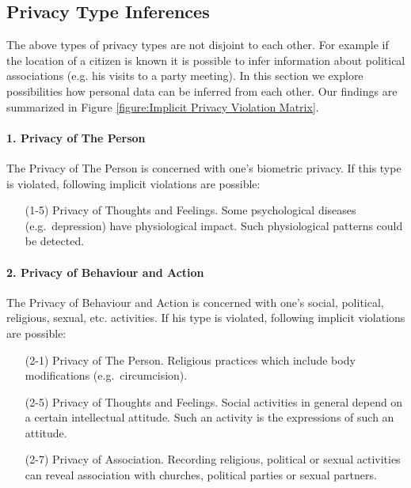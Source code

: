 \subsection{Privacy Type Inferences}

The above types of privacy types are not disjoint to each other.
For example if the location of a citizen is known it is possible to infer information about political associations (e.g. his visits to a party meeting).
In this section we explore possibilities how personal data can be inferred from each other.
Our findings are summarized in Figure \ref{figure:Implicit Privacy Violation Matrix}.

\paragraph*{1. Privacy of The Person}

The Privacy of The Person is concerned with one's biometric privacy.
If this type is violated, following implicit violations are possible:

\begin{itemize}
\item [(1-5)]
  Privacy of Thoughts and Feelings. Some psychological diseases
  (e.g.~depression) have physiological impact. Such physiological
  patterns could be detected.
\end{itemize}

\paragraph*{2. Privacy of Behaviour and Action}

The Privacy of Behaviour and Action is concerned with one's social, political, religious, sexual, etc. activities.
If his type is violated, following implicit violations are possible:

\begin{itemize}
\item [(2-1)] Privacy of The Person.
  Religious practices which include body modifications (e.g.~circumcision).
\item [(2-5)] Privacy of Thoughts and Feelings.
  Social activities in general depend on a certain intellectual attitude.
  Such an activity is the expressions of such an attitude.
\item [(2-7)] Privacy of Association.
  Recording religious, political or sexual activities can reveal association with churches, political parties or sexual partners.
\end{itemize}

